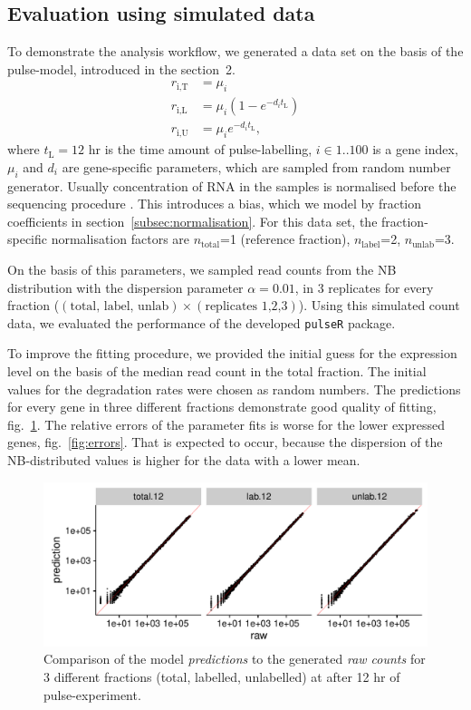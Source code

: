 \subsection{Evaluation using simulated data}
To demonstrate the analysis workflow, we generated a data 
set on the basis of the pulse-model, introduced in the section~2.
\begin{align}
 r_\text{i,T}&=\mu_i\\
 r_\text{i,L}&=\mu_i \left(1-e^{-d_it_\text{L}}\right)\\
 r_\text{i,U}&=\mu_i e^{-d_it_\text{L}},
\end{align}
where $t_\text{L} = 12$ hr is the time amount of pulse-labelling,
$i \in 1..100$ is a gene index, $\mu_i$ and $d_i$ are gene-specific parameters,
which are sampled from random number generator.
Usually concentration of RNA in the samples is normalised before the
sequencing procedure \citep{}. This introduces a bias, which 
we model by fraction coefficients in section~\ref{subsec:normalisation}. 
For this data set,  the fraction-specific normalisation factors are 
$n_\text{total}$=1 ({reference fraction}),
$n_\text{label}$=2,
$n_\text{unlab}$=3.
\par 
On the basis of this parameters,  we sampled read counts from the NB distribution 
with the dispersion parameter $\alpha=0.01$,  in 3 replicates for 
every fraction ($(\text{total, label, unlab})\times(\text{replicates 1,2,3})$).
Using this simulated count data,  we evaluated the performance of the developed
\verb|pulseR| package.
\par
To improve the fitting procedure, we provided the initial guess for the expression level
on the basis of the median read count in the total fraction.
The initial values for the degradation rates were chosen as random numbers.
The predictions for every gene in three different fractions demonstrate
good quality of fitting, fig.~\ref{fig:predictions}. The relative errors of
the parameter fits is worse for the lower expressed genes, fig.~\ref{fig:errors}.
That is expected to occur, because the dispersion of the NB-distributed values
is higher for the data with a lower mean.
\begin{figure}
 \includegraphics[width=\linewidth]{fig/predictions}
 \caption{Comparison of the model \emph{predictions} to the generated 
 \emph{raw counts} for 3 different fractions (total, labelled, unlabelled)
 at after 12 hr of pulse-experiment.}
 \label{fig:predictions}
\end{figure}

